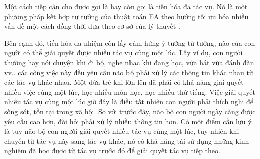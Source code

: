 Một cách tiếp cận  cho  được gọi là  hay còn gọi là tiến hóa đa tác vụ. Nó là một phương pháp kết hợp tư tưởng của thuật toán EA theo hướng tối ưu hóa nhiều vấn đề một cách đồng thời dựa theo cơ sở của lý thuyết .

Bên cạnh đó, tiến hóa đa nhiệm còn lấy cảm hứng ý tưởng từ tưởng, não của con người có thể giải quyết được nhiều tác vụ cùng một lúc. Lấy ví dụ, con người thường hay nói chuyện khi đi bộ, nghe nhạc khi đang học, vừa hát vừa đánh đàn vv.. các công việc này đều yêu cầu não bộ phải xử lý các thông tin khác nhau từ các tác vụ khác nhau. Một đứa trẻ khi lớn lên đã phải có khả năng giải quyết nhiều việc cùng một lúc, học nhiều môn học, học nhiều thứ tiếng. Việc giải quyết nhiều tác vụ cùng một lúc giờ đây là điều tất nhiên con người phải thích nghi để sống sót, tồn tại trong xã hội. So với trước đây, não bộ con người ngày càng được yêu cầu cao hơn, đòi hỏi phải xử lý nhiều thông tin hơn. Có một điểm cần lưu ý là tuy não bộ con người giải quyết nhiều tác vụ cùng một lúc, tuy nhiên khi chuyển từ tác vụ này sang tác vụ khác, nó có khả năng tái sử dụng những kinh nghiệm đã học được từ tác vụ trước đó để giải quyết tác vụ tiếp theo. 